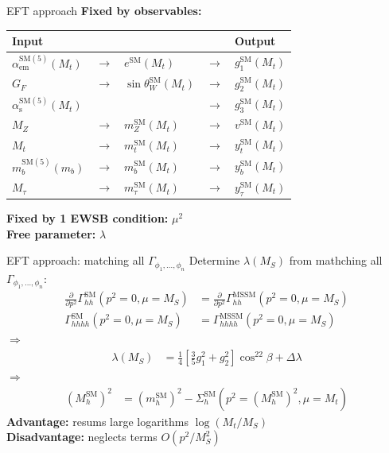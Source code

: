 \documentclass[hyperref={pdfpagelabels=false},ngerman]{beamer}
\renewcommand{\emph}{\textbf}
\newcommand{\SM}{\ensuremath{\text{SM}}}
\begin{document}
\begin{frame}{EFT approach}
  \emph{Fixed by observables:}
  \begin{table}
    \centering
    \begin{tabular}{lllll}
      Input & & & & Output \\
      \midrule
      $\alpha_\text{em}^{\SM(5)}(M_t)$ & $\rightarrow$ & $e^\SM(M_t)$ & $\rightarrow$ & $g_1^\SM(M_t)$ \\
      $G_F$ & $\rightarrow$ & $\sin\theta_W^\SM(M_t)$ & $\rightarrow$ & $g_2^\SM(M_t)$ \\
      $\alpha_\text{s}^{\SM(5)}(M_t)$ & & & $\rightarrow$ & $g_3^\SM(M_t)$ \\
      $M_Z$ & $\rightarrow$ & $m_Z^\SM(M_t)$ & $\rightarrow$ & $v^\SM(M_t)$ \\
      $M_t$ & $\rightarrow$ & $m_t^\SM(M_t)$ & $\rightarrow$ & $y_t^\SM(M_t)$ \\
      $m_b^{\SM(5)}(m_b)$ & $\rightarrow$ & $m_b^\SM(M_t)$ & $\rightarrow$ & $y_b^\SM(M_t)$ \\
      $M_\tau$ & $\rightarrow$ & $m_\tau^\SM(M_t)$ & $\rightarrow$ & $y_\tau^\SM(M_t)$ \\
    \end{tabular}
  \end{table}
  \emph{Fixed by 1 EWSB condition:} $\mu^2$ \\[1em]
  \emph{Free parameter:} $\lambda$
\end{frame}

\begin{frame}{EFT approach: matching all $\Gamma_{\phi_1,\ldots,\phi_n}$}
  Determine $\lambda(M_S)$ from mathching all $\Gamma_{\phi_1,\ldots,\phi_n}$:
  \begin{align*}
    \frac{\partial}{\partial p^2}\Gamma_{hh}^{\SM}(p^2 = 0, \mu = M_S) &= \frac{\partial}{\partial p^2}\Gamma_{hh}^\text{MSSM}(p^2 = 0, \mu = M_S) \\
    \Gamma_{hhhh}^{\SM}(p^2 = 0, \mu = M_S) &= \Gamma_{hhhh}^\text{MSSM}(p^2 = 0, \mu = M_S)
  \end{align*}
  $\Rightarrow$
  \begin{align*}
    \lambda (M_S) &= \frac{1}{4}\left[\frac{3}{5} g_1^{2} + g_2^2\right] \cos^22\beta
    + \Delta \lambda
  \end{align*}
  $\Rightarrow$
  \begin{align*}
    (M_h^\SM)^2 &= (m_h^\SM)^2 - \Sigma^\SM_h(p^2 = (M_h^\SM)^2,\mu =
    M_t)
  \end{align*}
  \emph{Advantage:} resums large logarithms $\log(M_t/M_S)$\\
  \emph{Disadvantage:} neglects terms $O(p^2/M_S^2)$
\end{frame}
\end{document}
